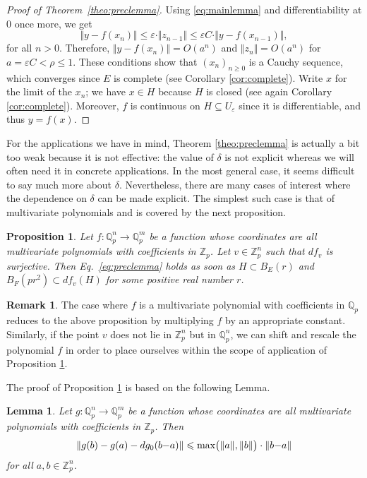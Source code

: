 \documentclass[11pt]{article}
\numberwithin{equation}{section}
\numberwithin{figure}{section}
\renewcommand{\leq}{\leqslant}
\renewcommand{\geq}{\geqslant}
\newtheorem{prop}[theo]{Proposition}
\newtheorem{lem}[theo]{Lemma}
\theoremstyle{definition}
\newtheorem{rem}[theo]{Remark}
\newcommand{\Z}{\mathbb Z}
\newcommand{\Zp}{\Z_p}
\newcommand{\Q}{\mathbb Q}
\newcommand{\Qp}{\Q_p}
\renewcommand{\max}{\text{\rm max}}
\begin{document}
\begin{proof}[Proof of Theorem~\ref{theo:preclemma}]
Using \eqref{eq:mainlemma} and differentiability at $0$ once more,
we get
$$\Vert y  - f(x_n) \Vert
\leq \varepsilon \cdot \Vert z_{n-1} \Vert \leq \varepsilon C \cdot \Vert
y - f(x_{n-1}) \Vert,$$
for all $n > 0$.  Therefore, $\Vert y - f(x_n) \Vert = O(a^n)$ and
$\Vert z_n \Vert = O(a^n)$ for $a = \varepsilon C < \rho \leq 1$.
These conditions show that $(x_n)_{n \geq 0}$ is a Cauchy sequence, which converges 
since $E$ is complete (see Corollary \ref{cor:complete}). Write $x$ for the 
limit of the $x_n$; we have $x \in H$ because $H$ is closed (see again
Corollary \ref{cor:complete}). Moreover, 
$f$ is continuous on $H \subseteq U_\varepsilon$ since it is 
differentiable, and thus $y=f(x)$.
\end{proof}

For the applications we have in mind, Theorem \ref{theo:preclemma} is 
actually a bit too weak because it is not effective: the value of 
$\delta$ is not explicit whereas we will often need it in concrete 
applications. In the most general case, it seems difficult to say much 
more about $\delta$. Nevertheless, there are many cases of interest 
where the dependence on $\delta$ can be made explicit.
The simplest such case is that of multivariate polynomials and is
covered by the next proposition.

\begin{prop}
\label{prop:preclemmapoly}
Let $f : \Qp^n \to \Qp^m$ be a function whose coordinates are all 
multivariate polynomials with coefficients in $\Zp$. Let $v \in \Zp^n$ 
such that $df_v$ is surjective. Then Eq.~\eqref{eq:preclemma} holds as 
soon as $H \subset B_E(r)$ and $B_F(p r^2) \subset df_v(H)$ for some 
positive real number $r$.
\end{prop}

\begin{rem}
The case where $f$ is a multivariate polynomial with coefficients in
$\Qp$ reduces to the above proposition by multiplying $f$ by an
appropriate constant. Similarly, if the point $v$ does not lie in
$\Zp^n$ but in $\Qp^n$, we can shift and rescale the polynomial $f$ 
in order to place ourselves within the scope of application of
Proposition \ref{prop:preclemmapoly}.
\end{rem}

The proof of Proposition \ref{prop:preclemmapoly} is based on the
following Lemma.

\begin{lem}
\label{lem:multipolyC1}
Let $g : \Qp^n \to \Qp^m$ be a function whose coordinates are all
multivariate polynomials with coefficients in $\Zp$. Then
$$\Vert g(b) - g(a) - dg_0(b{-}a) \Vert \leq \max 
  \big(\Vert a \Vert, \Vert b \Vert \big) \cdot \Vert b{-}a \Vert$$
for all $a,b \in \Zp^n$.
\end{lem}
\end{document}
